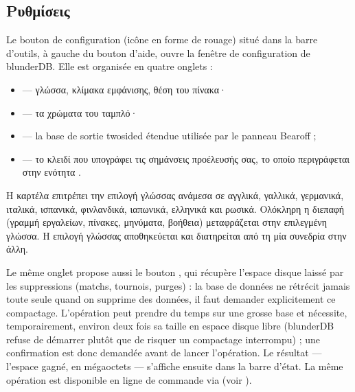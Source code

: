 \documentclass[letterpaper,10pt,greek]{sphinxmanual}
\begin{document}
\subsection{Ρυθμίσεις}
\label{\detokenize{manuel:configuration}}\label{\detokenize{manuel:id2}}
\sphinxAtStartPar
Le bouton de configuration (icône en forme de rouage) situé dans la barre
d’outils, à gauche du bouton d’aide, ouvre la fenêtre de configuration de
blunderDB. Elle est organisée en quatre onglets :
\begin{itemize}
\item {} 
\sphinxAtStartPar
{} — γλώσσα, κλίμακα εμφάνισης, θέση του πίνακα·

\item {} 
\sphinxAtStartPar
{} — τα χρώματα του ταμπλό·

\item {} 
\sphinxAtStartPar
{} — la base de sortie two\sphinxhyphen{}sided étendue utilisée par le panneau
Bearoff ;

\item {} 
\sphinxAtStartPar
{} — το κλειδί που υπογράφει τις σημάνσεις προέλευσής σας, το οποίο περιγράφεται στην ενότητα {\hyperref[\detokenize{manuel:diffusion-controlee}]{}}.

\end{itemize}

\sphinxAtStartPar
Η καρτέλα  επιτρέπει την επιλογή γλώσσας ανάμεσα σε αγγλικά, γαλλικά, γερμανικά, ιταλικά, ισπανικά, φινλανδικά, ιαπωνικά, ελληνικά και ρωσικά. Ολόκληρη η διεπαφή (γραμμή εργαλείων, πίνακες, μηνύματα, βοήθεια) μεταφράζεται στην επιλεγμένη γλώσσα. Η επιλογή γλώσσας αποθηκεύεται και διατηρείται από τη μία συνεδρία στην άλλη.

\sphinxAtStartPar
Le même onglet propose aussi le bouton , qui récupère
l’espace disque laissé par les suppressions (matchs, tournois, purges) : la
base de données ne rétrécit jamais toute seule quand on supprime des données,
il faut demander explicitement ce compactage. L’opération peut prendre du
temps sur une grosse base et nécessite, temporairement, environ deux fois sa
taille en espace disque libre (blunderDB refuse de démarrer plutôt que de
risquer un compactage interrompu) ; une confirmation est donc demandée avant
de lancer l’opération. Le résultat — l’espace gagné, en mégaoctets — s’affiche
ensuite dans la barre d’état. La même opération est disponible en ligne de
commande via  (voir {\hyperref[\detokenize{cli:cli}]{}}).
\end{document}
